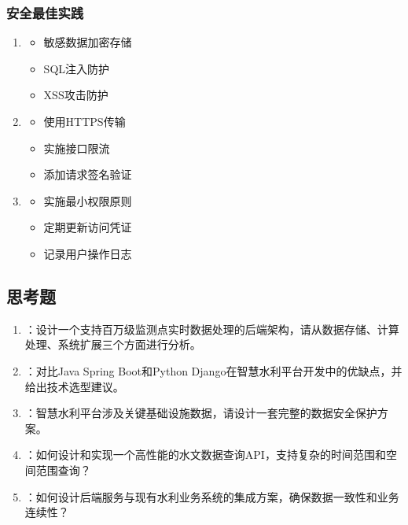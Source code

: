 \hypertarget{ux5b89ux5168ux6700ux4f73ux5b9eux8df5}{%
\subsubsection{安全最佳实践}\label{ux5b89ux5168ux6700ux4f73ux5b9eux8df5}}

\begin{enumerate}
\def\labelenumi{\arabic{enumi}.}
\item

  \begin{itemize}
  \tightlist
  \item
    敏感数据加密存储
  \item
    SQL注入防护
  \item
    XSS攻击防护
  \end{itemize}
\item

  \begin{itemize}
  \tightlist
  \item
    使用HTTPS传输
  \item
    实施接口限流
  \item
    添加请求签名验证
  \end{itemize}
\item

  \begin{itemize}
  \tightlist
  \item
    实施最小权限原则
  \item
    定期更新访问凭证
  \item
    记录用户操作日志
  \end{itemize}
\end{enumerate}

\hypertarget{ux601dux8003ux9898}{%
\subsection{思考题}\label{ux601dux8003ux9898}}

\begin{enumerate}
\def\labelenumi{\arabic{enumi}.}
\item
  ：设计一个支持百万级监测点实时数据处理的后端架构，请从数据存储、计算处理、系统扩展三个方面进行分析。
\item
  ：对比Java Spring Boot和Python Django在智慧水利平台开发中的优缺点，并给出技术选型建议。
\item
  ：智慧水利平台涉及关键基础设施数据，请设计一套完整的数据安全保护方案。
\item
  ：如何设计和实现一个高性能的水文数据查询API，支持复杂的时间范围和空间范围查询？
\item
  ：如何设计后端服务与现有水利业务系统的集成方案，确保数据一致性和业务连续性？
\end{enumerate}


